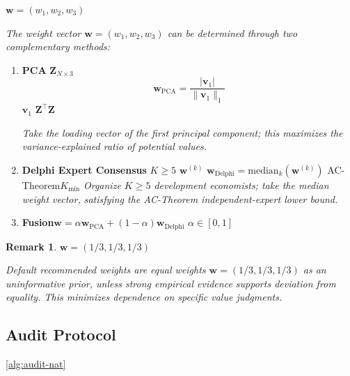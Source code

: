 \documentclass[11pt,a4paper]{article}
\theoremstyle{definition}
\newtheorem{remark}{ Remark}[section]
\begin{document}
 $\mathbf{w} = (w_1, w_2, w_3)$ 

\medskip
\noindent\textit{The weight vector $\mathbf{w} = (w_1, w_2, w_3)$ can be determined through two complementary methods:}

\begin{enumerate}[leftmargin=*,label=\textbf{ \arabic*:}]
    \item \textbf{ PCA}
     $\mathbf{Z}_{N \times 3}$ 
    \begin{equation}
        \mathbf{w}_{\text{PCA}} = \frac{|\mathbf{v}_1|}{\|\mathbf{v}_1\|_1}
    \end{equation}
     $\mathbf{v}_1$  $\mathbf{Z}^\top \mathbf{Z}$ 
    
    \textit{Take the loading vector of the first principal component; this maximizes the variance-explained ratio of potential values.}
    
    \item \textbf{ Delphi Expert Consensus}
     $K \geq 5$  $\mathbf{w}^{(k)}$
     $\mathbf{w}_{\text{Delphi}} = \text{median}_k(\mathbf{w}^{(k)})$
    AC-Theorem$K_{\min}$ 
    \textit{Organize $K \geq 5$ development economists; take the median weight vector, satisfying the AC-Theorem independent-expert lower bound.}
    
    \item \textbf{ Fusion}$\mathbf{w} = \alpha \mathbf{w}_{\text{PCA}} + (1-\alpha) \mathbf{w}_{\text{Delphi}}$
    $\alpha \in [0, 1]$
\end{enumerate}

\begin{remark}
 $\mathbf{w} = (1/3, 1/3, 1/3)$

\textit{Default recommended weights are equal weights $\mathbf{w} = (1/3, 1/3, 1/3)$ as an uninformative prior, unless strong empirical evidence supports deviation from equality. This minimizes dependence on specific value judgments.}
\end{remark}

\subsection{ Audit Protocol}

\ref{alg:audit-nat}
\end{document}
